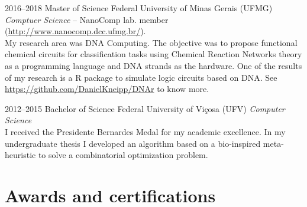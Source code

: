 \documentclass[a4paper]{cv-friggeri-x}
\begin{document}
\begin{entrylist}

\entry
    {2016--2018}
    {Master {\normalfont of Science}}
    {Federal University of Minas Gerais (UFMG)}
    {\emph{Comptuer Science} --
    \footnotesize{NanoComp lab. member (\href{http://www.nanocomp.dcc.ufmg.br/}{http://www.nanocomp.dcc.ufmg.br/}).}\\
    \normalsize{My research area was DNA Computing. The objective was to propose functional chemical circuits for classification tasks using Chemical Reaction Networks theory as a programming language and DNA strands as the hardware. One of the results of my research is a R package to simulate logic circuits based on DNA. See \href{https://github.com/DanielKneipp/DNAr}{https://github.com/DanielKneipp/DNAr} to know more.}}

\entry
    {2012--2015}
    {Bachelor {\normalfont of Science}}
    {Federal University of Vi\c cosa (UFV)}
    {\emph{Computer Science}\\
    I received the Presidente Bernardes Medal for my academic excellence. In my undergraduate thesis I developed an algorithm based on a bio-inspired meta-heuristic to solve a combinatorial optimization problem.}





\end{entrylist}


\section{Awards and certifications}
\end{document}
